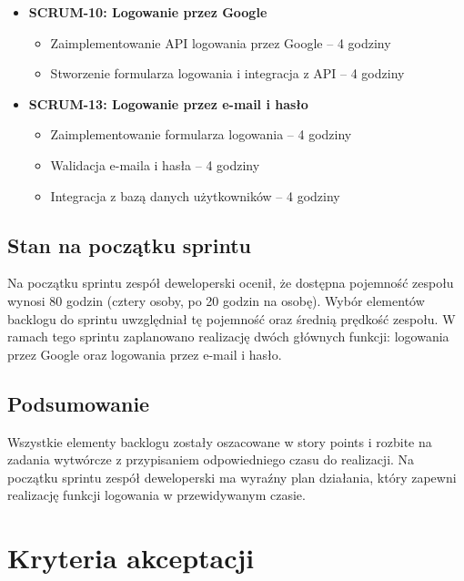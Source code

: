 \documentclass[12pt,a4paper,colorlinks=true,linkcolor=NavyBlue,citecolor=red,urlcolor=NavyBlue]{book}
\begin{document}
\begin{itemize}[topsep=0pt, itemsep=0.3em]
    \item \textbf{SCRUM-10: Logowanie przez Google}
    \begin{itemize}[topsep=0pt, itemsep=0.3em]
        \item Zaimplementowanie API logowania przez Google – 4 godziny
        \item Stworzenie formularza logowania i integracja z API – 4 godziny
    \end{itemize}
    \item \textbf{SCRUM-13: Logowanie przez e-mail i hasło}
    \begin{itemize}[topsep=0pt, itemsep=0.3em]
        \item Zaimplementowanie formularza logowania – 4 godziny
        \item Walidacja e-maila i hasła – 4 godziny
        \item Integracja z bazą danych użytkowników – 4 godziny
    \end{itemize}
\end{itemize}

\section{Stan na początku sprintu}

Na początku sprintu zespół deweloperski ocenił, że dostępna pojemność zespołu wynosi 80 godzin (cztery osoby, po 20 godzin na osobę). Wybór elementów backlogu do sprintu uwzględniał tę pojemność oraz średnią prędkość zespołu. W ramach tego sprintu zaplanowano realizację dwóch głównych funkcji: logowania przez Google oraz logowania przez e-mail i hasło.

\section{Podsumowanie}

Wszystkie elementy backlogu zostały oszacowane w story points i rozbite na zadania wytwórcze z przypisaniem odpowiedniego czasu do realizacji. Na początku sprintu zespół deweloperski ma wyraźny plan działania, który zapewni realizację funkcji logowania w przewidywanym czasie.


\newpage
\thispagestyle{empty}
\null
\newpage

\chapter{Kryteria akceptacji}
\end{document}
